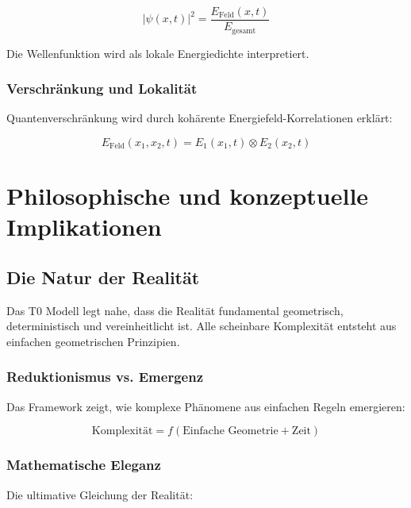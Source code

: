 	\begin{equation}
		|\psi(x,t)|^2 = \frac{E_{\text{Feld}}(x,t)}{E_{\text{gesamt}}}
	\end{equation}
	
	Die Wellenfunktion wird als lokale Energiedichte interpretiert.
	
	\subsection{Verschränkung und Lokalität}
	
	Quantenverschränkung wird durch kohärente Energiefeld-Korrelationen erklärt:
	
	\begin{equation}
		E_{\text{Feld}}(x_1, x_2, t) = E_1(x_1,t) \otimes E_2(x_2,t)
	\end{equation}
	
	\chapter{Philosophische und konzeptuelle Implikationen}
	
	\section{Die Natur der Realität}
	
	\begin{erkenntnis}
		Das T0 Modell legt nahe, dass die Realität fundamental geometrisch, deterministisch und vereinheitlicht ist. Alle scheinbare Komplexität entsteht aus einfachen geometrischen Prinzipien.
	\end{erkenntnis}
	
	\subsection{Reduktionismus vs. Emergenz}
	
	Das Framework zeigt, wie komplexe Phänomene aus einfachen Regeln emergieren:
	
	\begin{equation}
		\text{Komplexität} = f(\text{Einfache Geometrie} + \text{Zeit})
	\end{equation}
	
	\subsection{Mathematische Eleganz}
	
	Die ultimative Gleichung der Realität:
	
